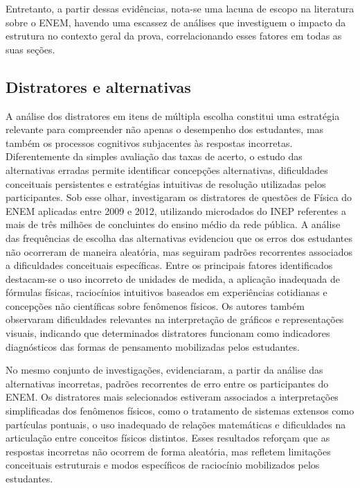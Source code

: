 \documentclass[a4paper,10pt, twocolumn]{article}
\begin{document}
Entretanto, a partir dessas evidências, nota-se uma lacuna de escopo na literatura sobre o ENEM, havendo uma escassez de análises que investiguem o impacto da estrutura no contexto geral da prova, correlacionando esses fatores em todas as suas seções.

\subsection{Distratores e alternativas}

A análise dos distratores em itens de múltipla escolha constitui uma estratégia relevante para compreender não apenas o desempenho dos estudantes, mas também os processos cognitivos subjacentes às respostas incorretas. Diferentemente da simples avaliação das taxas de acerto, o estudo das alternativas erradas permite identificar concepções alternativas, dificuldades conceituais persistentes e estratégias intuitivas de resolução utilizadas pelos participantes.
\cite{Marcom2016,lopes2015estudo}
Sob esse olhar, \textcite{Marcom2016} investigaram os distratores de questões de Física do ENEM aplicadas entre 2009 e 2012, utilizando microdados do INEP referentes a mais de três milhões de concluintes do ensino médio da rede pública. A análise das frequências de escolha das alternativas evidenciou que os erros dos estudantes não ocorreram de maneira aleatória, mas seguiram padrões recorrentes associados a dificuldades conceituais específicas. Entre os principais fatores identificados destacam-se o uso incorreto de unidades de medida, a aplicação inadequada de fórmulas físicas, raciocínios intuitivos baseados em experiências cotidianas e concepções não científicas sobre fenômenos físicos. Os autores também observaram dificuldades relevantes na interpretação de gráficos e representações visuais, indicando que determinados distratores funcionam como indicadores diagnósticos das formas de pensamento mobilizadas pelos estudantes.

No mesmo conjunto de investigações, \textcite{lopes2015estudo} evidenciaram, a partir da análise das alternativas incorretas, padrões recorrentes de erro entre os participantes do ENEM. Os distratores mais selecionados estiveram associados a interpretações simplificadas dos fenômenos físicos, como o tratamento de sistemas extensos como partículas pontuais, o uso inadequado de relações matemáticas e dificuldades na articulação entre conceitos físicos distintos. Esses resultados reforçam que as respostas incorretas não ocorrem de forma aleatória, mas refletem limitações conceituais estruturais e modos específicos de raciocínio mobilizados pelos estudantes.
\end{document}
